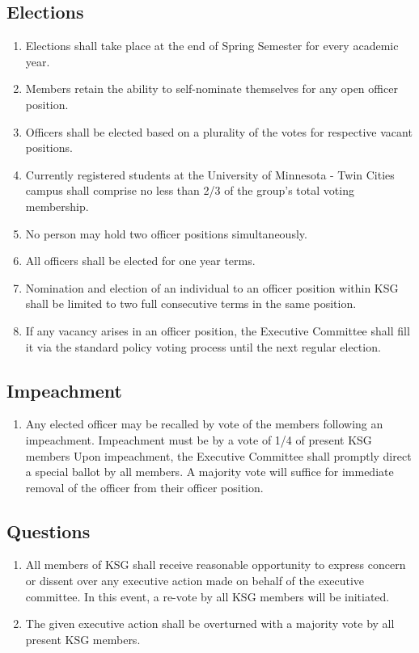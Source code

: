 \documentclass[12pt,executivepaper]{article}
\begin{document}
\subsection{Elections}
\begin{enumerate}
    \item Elections shall take place at the end of Spring Semester for every academic year.
    \item Members retain the ability to self-nominate themselves for any open officer position.
    \item Officers shall be elected based on a plurality of the votes for respective vacant
          positions.
    \item Currently registered students at the University of Minnesota - Twin Cities campus
          shall comprise no less than 2/3 of the group's total voting membership. 
    \item No person may hold two officer positions simultaneously.
    \item All officers shall be elected for one year terms.
    \item Nomination and election of an individual to an officer position within KSG shall be
          limited to two full consecutive terms in the same position.
    \item If any vacancy arises in an officer position, the Executive Committee shall fill
          it via the standard policy voting process until the next regular election.
\end{enumerate}

\subsection{Impeachment}
\begin{enumerate}
    \item Any elected officer may be recalled by vote of the members following an
          impeachment. Impeachment must be by a vote of 1/4 of present KSG members
          Upon impeachment, the Executive Committee shall promptly direct a special
          ballot by all members. A majority vote will suffice for immediate removal
          of the officer from their officer position.
\end{enumerate}

\subsection{Questions}
\begin{enumerate}
    \item All members of KSG shall receive reasonable opportunity to express concern
          or dissent over any executive action made on behalf of the executive committee.
          In this event, a re-vote by all KSG members will be initiated.
    \item The given executive action shall be overturned with a majority vote by
          all present KSG members.
\end{enumerate}
\end{document}
